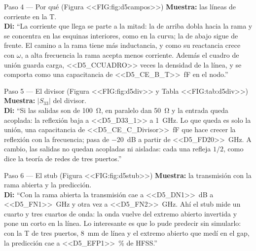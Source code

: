 \documentclass[11pt,letterpaper]{article}
\begin{document}
\begin{paso}{Paso 4 --- Por qué (Figura <<FIG:fig:d5campos>>)}
\textbf{Muestra:} las líneas de corriente en la T.\\
\textbf{Di:} ``La corriente que llega se parte a la mitad: la de arriba dobla hacia la rama y se concentra en las esquinas interiores, como en la curva; la de abajo sigue de frente. El camino a la rama tiene más inductancia, y como su reactancia crece con $\omega$, a alta frecuencia la rama acepta menos corriente. Además el cuadro de unión guarda carga, <<D5_CCUADRO>> veces la densidad de la línea, y se comporta como una capacitancia de \SI{<<D5_CE_B_T>>}{fF} en el nodo.''
\end{paso}

\begin{paso}{Paso 5 --- El divisor (Figura <<FIG:fig:d5div>> y Tabla <<FIG:tab:d5div>>)}
\textbf{Muestra:} $|S_{33}|$ del divisor.\\
\textbf{Di:} ``Si las salidas son de \SI{100}{\ohm}, en paralelo dan \SI{50}{\ohm} y la entrada queda acoplada: la reflexión baja a <<D5_D33_1>> a \SI{1}{GHz}. Lo que queda es solo la unión, una capacitancia de \SI{<<D5_CE_C_Divisor>>}{fF} que hace crecer la reflexión con la frecuencia; pasa de $-20$~dB a partir de \SI{<<D5_FD20>>}{GHz}. A cambio, las salidas no quedan acopladas ni aisladas: cada una refleja $1/2$, como dice la teoría de redes de tres puertos.''
\end{paso}

\begin{paso}{Paso 6 --- El stub (Figura <<FIG:fig:d5stub>>)}
\textbf{Muestra:} la transmisión con la rama abierta y la predicción.\\
\textbf{Di:} ``Con la rama abierta la transmisión cae a \SI{<<D5_DN1>>}{dB} a \SI{<<D5_FN1>>}{GHz} y otra vez a \SI{<<D5_FN2>>}{GHz}. Ahí el stub mide un cuarto y tres cuartos de onda: la onda vuelve del extremo abierto invertida y pone un corto en la línea. Lo interesante es que lo pude predecir sin simularlo: con la T de tres puertos, \SI{8}{mm} de línea y el extremo abierto que medí en el gap, la predicción cae a \SI{<<D5_EFP1>>}{\percent} de HFSS.''
\end{paso}
\end{document}
